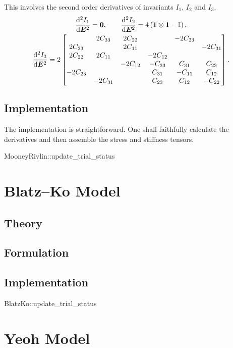This involves the second order derivatives of invariants $I_1$, $I_2$ and $I_3$.
\begin{gather}
\dfrac{\mathrm{d}^2I_1}{\mathrm{d}\bm{E}^2}=\bm{0},\qquad
\dfrac{\mathrm{d}^2I_2}{\mathrm{d}\bm{E}^2}=4\left(\bm{1}\otimes\bm{1}-\mathbb{I}\right),\\
\begin{split}
\dfrac{\mathrm{d}^2I_3}{\mathrm{d}\bm{E}^2}=2\begin{bmatrix}
             & 2C_{33}  & 2C_{22}  &          & -2C_{23} &          \\
    2C_{33}  &          & 2C_{11}  &          &          & -2C_{31} \\
    2C_{22}  & 2C_{11}  &          & -2C_{12} &          &          \\
             &          & -2C_{12} & -C_{33}  & C_{31}   & C_{23}   \\
    -2C_{23} &          &          & C_{31}   & -C_{11}  & C_{12}   \\
             & -2C_{31} &          & C_{23}   & C_{12}   & -C_{22}
\end{bmatrix}.
\end{split}
\end{gather}
\subsection{Implementation}
The implementation is straightforward.
One shall faithfully calculate the derivatives and then assemble the stress and stiffness tensors.
\begin{cppcode}
MooneyRivlin::update_trial_status
\end{cppcode}
\section{Blatz--Ko Model}
\subsection{Theory}
\subsection{Formulation}
\subsection{Implementation}
\begin{cppcode}
BlatzKo::update_trial_status
\end{cppcode}
\section{Yeoh Model}
